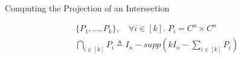 \documentclass[11pt,svgnames,smaller,aspectratio=43,english]{beamer}
\begin{document}
\begin{frame}{Computing the Projection of an Intersection}

	\begin{gather*}
		\{P_1, ..., P_k\},\quad \forall i\in [k].\; P_i = C^n \times C^n\\
		\bigcap_{i\in [k]} P_i \triangleq I_n - supp(kI_n - \sum_{i\in [k]} P_i)
	\end{gather*}
\end{frame}


\end{document}
